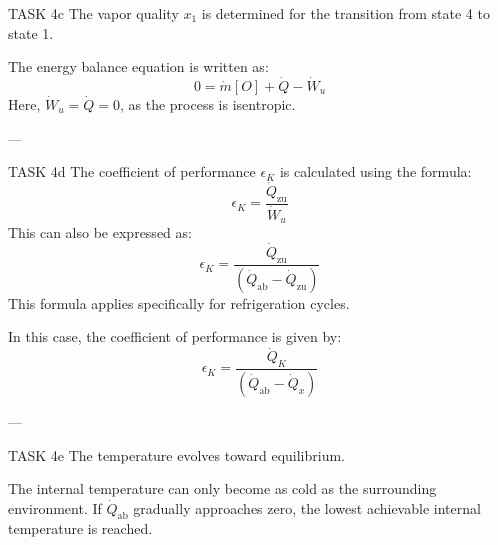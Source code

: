 TASK 4c  
The vapor quality \( x_1 \) is determined for the transition from state 4 to state 1.  

The energy balance equation is written as:  
\[
0 = \dot{m} \left[ O \right] + \dot{Q} - \dot{W}_u
\]  
Here, \( \dot{W}_u = \dot{Q} = 0 \), as the process is isentropic.  

---

TASK 4d  
The coefficient of performance \( \epsilon_K \) is calculated using the formula:  
\[
\epsilon_K = \frac{\dot{Q}_{\text{zu}}}{\dot{W}_u}
\]  
This can also be expressed as:  
\[
\epsilon_K = \frac{\dot{Q}_{\text{zu}}}{\left( \dot{Q}_{\text{ab}} - \dot{Q}_{\text{zu}} \right)}
\]  
This formula applies specifically for refrigeration cycles.  

In this case, the coefficient of performance is given by:  
\[
\epsilon_K = \frac{\dot{Q}_K}{\left( \dot{Q}_{\text{ab}} - \dot{Q}_x \right)}
\]  

---

TASK 4e  
The temperature evolves toward equilibrium.  

The internal temperature can only become as cold as the surrounding environment. If \( \dot{Q}_{\text{ab}} \) gradually approaches zero, the lowest achievable internal temperature is reached.  

